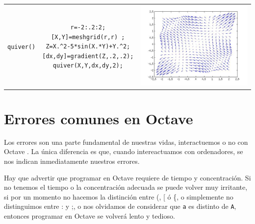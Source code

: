 \documentclass[letter,11pt]{article}
\newcommand\0{\mathbf{0}}
\newcommand{\octave}{{\sc Octave }}
\begin{document}
\begin{center}
\begin{longtable}{||l|c|c||}
\begin{minipage}{0.3\textwidth}
\end{minipage}
\\
\hline
  \texttt{quiver()}		& 
\begin{minipage}{3in}
\begin{verbatim}
r=-2:.2:2;
[X,Y]=meshgrid(r,r) ;
Z=X.^2-5*sin(X.*Y)+Y.^2;
[dx,dy]=gradient(Z,.2,.2);
quiver(X,Y,dx,dy,2);
\end{verbatim}
\end{minipage}
&
\begin{minipage}{0.3\textwidth}
\includegraphics[width=\textwidth]{./ej5.jpg}
\end{minipage}
\\
  \end{longtable}
 \end{center}


\section{Errores comunes en \octave}
Los errores son una parte fundamental de nuestras vidas, interactuemos o no con \octave. La \'unica diferencia es que, cuando intereactuamos con ordenadores, se nos indican inmediatamente nuestros errores.

Hay que advertir que programar en \octave requiere de tiempo y concentraci\'on. Si no tenemos el tiempo o la concentraci\'on adecuada se puede volver muy irritante, si por un momento no hacemos la distinci\'on entre (, [ \'o \{, o simplemente no distinguimos entre : y ;, o nos olvidamos de considerar que \texttt{a} es distinto de \texttt{A}, entonces programar en \octave se volver\'a lento y tedioso.
\end{document}
